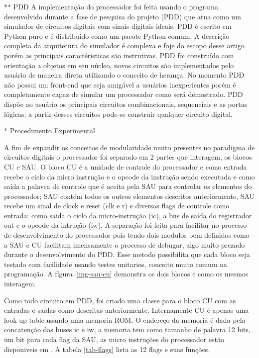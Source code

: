 ** PDD
A implementação do processador foi feita usando o programa desenvolvido durante a fase de pesquisa do projeto (PDD) que atua como um simulador de circuitos digitais com sinais digitais ideais. PDD é escrito em Python puro e é distribuido como um pacote Python comum. A descrição completa da arquitetura do simulador é complexa e foje do escopo desse artigo porém as principais caractéristicas são instrutivas. PDD foi construído com orientação a objetos em seu núcleo, novos circuitos são implementados pelo usuário de maneira direta utilizando o conceito de herança. No momento PDD não possui um front-end que seja amigável a usuários inexperientes porém é completamente capaz de simular um processador como será demostrado. PDD dispõe ao usuário os principais circuitos combinacionais, sequenciais e as portas lógicas; a partir desses circuitos pode-se construir qualquer circuito digital.

* Procedimento Experimental
  
A fim de expandir os conceitos de modularidade muito presentes no paradigma de circuitos digitais o processador foi separado em 2 partes que interagem, os blocos CU e SAU. O bloco CU é a unidade de controle do processador e como entrada recebe o ciclo da micro instrução e o opcode da instrução sendo executada e como saída a palavra de controle que é aceita pela SAU para controlar os elementos do processador; SAU contém todos os outros elementos descritos anteriormente, SAU recebe um sinal de clock e reset (clk e r) e diversas flags de controle como entrada; como saida o ciclo da micro-instrução (ic), a bus de saída do registrador out e o opcode da intrução (iw). A separação foi feita para facilitar no processo de desenvolvimento do processador pois tendo dois modulos bem definidos como a SAU e CU facilitam imensamente o processo de debugar, algo muito prezado durante o desenvolvimento do PDD. Esse metodo possibilita que cada bloco seja testado com facilidade usando testes unitarios, conceito muito comum na programação. A fígura \ref{img-sau-cu} demonstra os dois blocos e como os mesmos interagem.

Como todo circuito em PDD, foi criado uma classe para o bloco CU com as entradas e saídas como descritas anteriormente. Internamente CU é apenas uma look up table usando uma memoria ROM. O endereço da memoria é dada pela concatenção das buses ic e iw, a memoria tem como tamanho de palavra 12 bits, um bit para cada flag da SAU, as micro instruções do processador estão disponiveis em \cite{malv}. A tabela \ref{tab-flags} lista as 12 flags e suas funções. 

